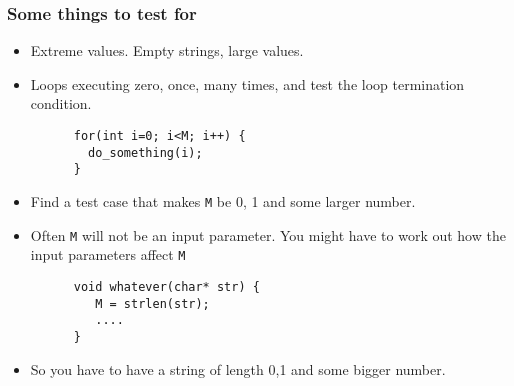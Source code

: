 \documentclass{beamer}
\begin{document}
\begin{frame}[fragile]
  \frametitle{Some things to test for}
  \begin{itemize}
  \item Extreme values. Empty strings, large values.
  \item Loops executing zero, once, many times, and test the loop
    termination condition.
    \begin{lstlisting}
      for(int i=0; i<M; i++) {
        do_something(i);
      }
    \end{lstlisting}
 \item  Find a test case that makes {\tt M} be 0, 1 and some larger
   number. 
 \item Often {\tt M} will not be an input parameter. You might have to
   work out how the input parameters affect {\tt M}
   \begin{lstlisting}
      void whatever(char* str) {
         M = strlen(str); 
         .... 
      }
   \end{lstlisting}
\item  So you have to have a string  of length 0,1 and some bigger number.
  \end{itemize}
\end{frame}
\end{document}
